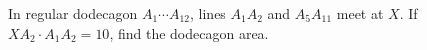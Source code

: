 In regular dodecagon $A_1\cdots A_{12}$, lines $A_1A_2$ and $A_5A_{11}$ meet at $X$. If $XA_2\cdot A_1A_2=10$, find the dodecagon area.
